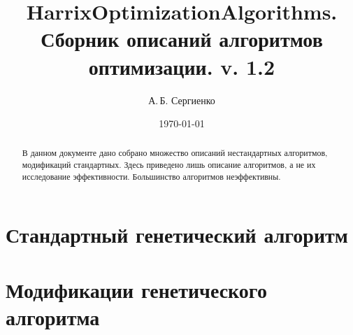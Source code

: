 \documentclass[a4paper,12pt]{article}
\title{HarrixOptimizationAlgorithms. Сборник описаний алгоритмов оптимизации. v. 1.2}
\author{А.\,Б. Сергиенко}
\date{\today}
\begin{document}


\maketitle

\begin{abstract}
В данном документе дано собрано множество описаний нестандартных алгоритмов, модификаций стандартных. Здесь приведено лишь описание алгоритмов, а не их исследование эффективности. Большинство алгоритмов неэффективны.
\end{abstract}

\tableofcontents

\newpage







\section{Стандартный генетический алгоритм}\label{HarrixOptimizationAlgorithms:GA}




\section{Модификации генетического алгоритма}\label{HarrixOptimizationAlgorithms:ModGA}






\newpage
\end{document}
